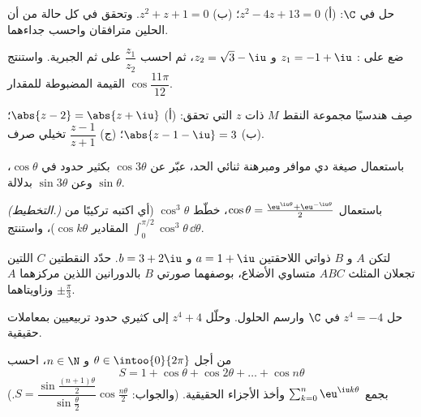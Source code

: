 \begin{exercise}[$\star$]\label{exo:g12:complex:2}
حل في $\C$: (أ) $z^2 - 4z + 13 = 0$؛ (ب) $z^2 + z + 1 = 0$. وتحقق في كل
حالة من أن الحلين مترافقان واحسب جداءهما.
\end{exercise}

\begin{exercise}[$\star$]\label{exo:g12:complex:3}
ضع على : $z_1 = -1 + \iu$ و $z_2 = \sqrt3 - \iu$، ثم احسب
$\dfrac{z_1}{z_2}$ على  ثم الجبرية. واستنتج القيمة
المضبوطة للمقدار $\cos\dfrac{11\pi}{12}$.
\end{exercise}

\begin{exercise}[$\star\star$]\label{exo:g12:complex:4}
صِف هندسيًا مجموعة النقط $M$ ذات  $z$ التي تحقق:
(أ) $\abs{z - 2} = \abs{z + \iu}$؛\quad
(ب) $\abs{z - 1 - \iu} = 3$؛\quad
(ج) $\dfrac{z - 1}{z + 1}$ تخيلي صرف.
\end{exercise}

\begin{exercise}[$\star\star$]\label{exo:g12:complex:5}
باستعمال صيغة دي موافر ومبرهنة ثنائي الحد، عبّر عن $\cos 3\theta$
بكثير حدود في $\cos\theta$، وعن $\sin 3\theta$ بدلالة
$\sin\theta$.
\end{exercise}

\begin{exercise}[$\star\star$]\label{exo:g12:complex:6}
\emph{(التخطيط.)} باستعمال
$\cos\theta = \frac{\eu^{\iu\theta} + \eu^{-\iu\theta}}{2}$، خطّط
$\cos^3\theta$ (أي اكتبه تركيبًا من المقادير $\cos k\theta$)، واستنتج
$\displaystyle\int_0^{\pi/2}\cos^3\theta\,\dd\theta$.
\end{exercise}

\begin{exercise}[$\star\star$]\label{exo:g12:complex:7}
لتكن $A$ و $B$ ذواتي اللاحقتين $a = 1 + \iu$ و $b = 3 + 2\iu$. حدّد
النقطتين $C$ اللتين تجعلان المثلث $ABC$ متساوي الأضلاع، بوصفهما صورتي $B$
بالدورانين اللذين مركزهما $A$ وزاويتاهما $\pm\frac{\pi}{3}$.
\end{exercise}

\begin{exercise}[$\star\star\star$]\label{exo:g12:complex:8}
حل $z^4 = -4$ في $\C$ وارسم الحلول. وحلّل
$z^4 + 4$ إلى كثيري حدود تربيعيين بمعاملات حقيقية.
\end{exercise}

\begin{exercise}[$\star\star\star$]\label{exo:g12:complex:9}
من أجل $\theta \in \intoo{0}{2\pi}$ و $n \in \N$، احسب
\[
S = 1 + \cos\theta + \cos 2\theta + \dots + \cos n\theta
\]
بجمع 
$\sum_{k=0}^n \eu^{\iu k\theta}$ وأخذ الأجزاء الحقيقية. (والجواب:
$S = \dfrac{\sin\frac{(n+1)\theta}{2}}{\sin\frac{\theta}{2}}
\cos\frac{n\theta}{2}$.)
\end{exercise}

